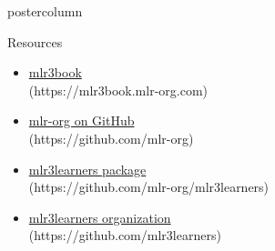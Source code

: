 \documentclass{beamer}
\begin{document}
\begin{withoutheader}
\begin{frame}[fragile]{}
\begin{columns}
\begin{column}{.245\textwidth}
\begin{beamercolorbox}[center]{postercolumn}
\begin{minipage}{.98\textwidth}
{\begin{myblock}{Resources}
							\begin{itemize}
								\item \href{https://mlr3book.mlr-org.com/index.html}{mlr3book}\\ (https://mlr3book.mlr-org.com)
								\item \href{https://github.com/mlr-org}{mlr-org on GitHub}\\ (https://github.com/mlr-org)
								\item \href{https://github.com/mlr-org/mlr3learners}{mlr3learners package}\\ (https://github.com/mlr-org/mlr3learners)
								\item \href{https://github.com/mlr3learners}{mlr3learners organization}\\ (https://github.com/mlr3learners)
							\end{itemize}
						\end{myblock}
						\vfill
					}
				\end{minipage}
			\end{beamercolorbox}
		\end{column}
	\end{columns}
\end{frame}
\end{withoutheader}
\end{document}
